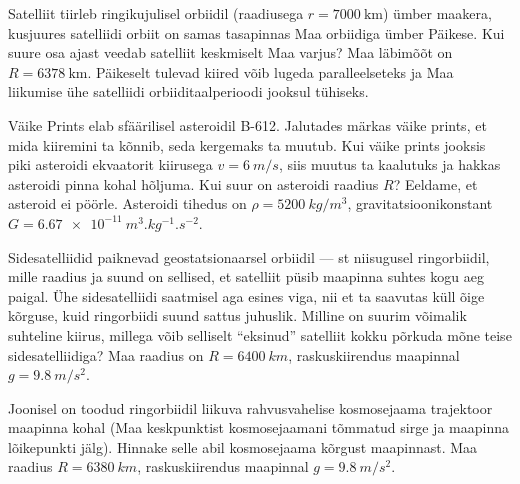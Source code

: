 \documentclass[10pt, twoside]{article}
\begin{document}
{%

Satelliit tiirleb ringikujulisel orbiidil (raadiusega $r=\SI{7000}{\kilo\metre}$) ümber maakera, kusjuures satelliidi orbiit on samas tasapinnas Maa orbiidiga ümber Päikese. Kui suure osa ajast veedab satelliit keskmiselt Maa varjus? Maa läbimõõt on $R=\SI{6378}{\kilo\metre}$. Päikeselt tulevad kiired võib lugeda paralleelseteks ja Maa liikumise ühe satelliidi orbiiditaalperioodi jooksul tühiseks.
\probend
\bigskip


Väike Prints elab sfäärilisel asteroidil B-612. Jalutades märkas väike prints, et mida kiiremini ta kõnnib, seda kergemaks ta muutub. Kui väike prints jooksis piki asteroidi ekvaatorit kiirusega $v = \SI{6}{m/s}$, siis muutus ta kaalutuks ja hakkas asteroidi pinna kohal hõljuma. Kui suur on asteroidi raadius $R$? Eeldame, et asteroid ei pöörle. Asteroidi tihedus on $\rho = \SI{5200}{kg/m^3}$, gravitatsioonikonstant $G = \SI{6.67e-11}{m^3.kg^{-1}.s^{-2}}$.
\probend
\bigskip


Sidesatelliidid paiknevad geostatsionaarsel orbiidil --- st niisugusel ringorbiidil, mille raadius ja suund on sellised, et satelliit püsib maapinna suhtes kogu aeg paigal. Ühe sidesatelliidi saatmisel aga esines viga, nii et ta saavutas küll õige kõrguse, kuid ringorbiidi suund sattus juhuslik. Milline on suurim võimalik suhteline kiirus, millega võib selliselt \enquote{eksinud} satelliit kokku põrkuda mõne teise sidesatelliidiga? Maa raadius on $R = \SI{6400}{km}$, raskuskiirendus maapinnal $g = \SI{9,8}{m/s^2}$.
\probend
\bigskip


Joonisel on toodud ringorbiidil liikuva rahvusvahelise kosmosejaama trajektoor maapinna kohal (Maa keskpunktist kosmosejaamani tõmmatud sirge ja maapinna lõikepunkti jälg). Hinnake selle abil kosmosejaama kõrgust maapinnast. Maa raadius $R = \SI{6380}{km}$, raskuskiirendus maapinnal $g = \SI{9,8}{m/s^2}$.

}
\end{document}
